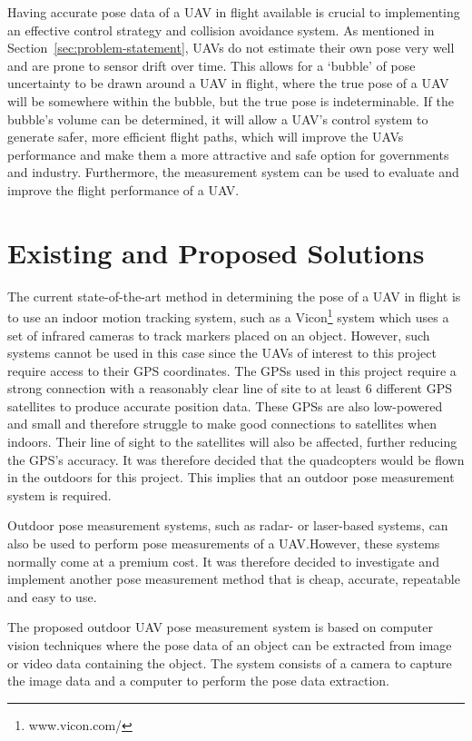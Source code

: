 Having accurate pose data of a UAV in flight available is crucial to implementing an effective control strategy and collision avoidance system. As mentioned in Section~\ref{sec:problem-statement}, UAVs do not estimate their own pose very well and are prone to sensor drift over time. This allows for a `bubble' of pose uncertainty to be drawn around a UAV in flight, where the true pose of a UAV will be somewhere within the bubble, but the true pose is indeterminable. If the bubble's volume can be determined, it will allow a UAV's control system to generate safer, more efficient flight paths, which will improve the UAVs performance and make them a more attractive and safe option for governments and industry. Furthermore, the measurement system can be used to evaluate and improve the flight performance of a UAV.\@ 

\section{Existing and Proposed Solutions}

The current state-of-the-art method in determining the pose of a UAV in flight is to use an indoor motion tracking system, such as a Vicon\footnote{www.vicon.com/} system which uses a set of infrared cameras to track markers placed on an object. However, such systems cannot be used in this case since the UAVs of interest to this project require access to their GPS coordinates. The GPSs used in this project require a strong connection with a reasonably clear line of site to at least 6 different GPS satellites to produce accurate position data. These GPSs are also low-powered and small and therefore struggle to make good connections to satellites when indoors. Their line of sight to the satellites will also be affected, further reducing the GPS's accuracy. It was therefore decided that the quadcopters would be flown in the outdoors for this project. This implies that an outdoor pose measurement system is required. 

Outdoor pose measurement systems, such as radar- or laser-based systems, can also be used to perform pose measurements of a UAV.\@ However, these systems normally come at a premium cost. It was therefore decided to investigate and implement another pose measurement method that is cheap, accurate, repeatable and easy to use. 

The proposed outdoor UAV pose measurement system is based on computer vision techniques where the pose data of an object can be extracted from image or video data containing the object. The system consists of a camera to capture the image data and a computer to perform the pose data extraction. 

